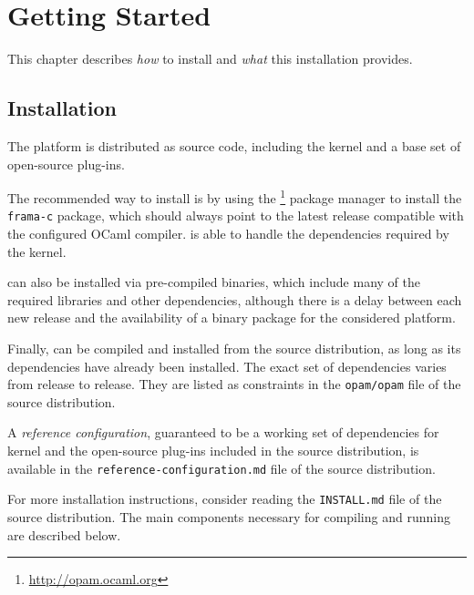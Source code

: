 \chapter{Getting Started}
\label{user-start}

This chapter describes \emph{how} to install \FramaC and
\emph{what} this installation provides.

\section{Installation}\label{sec:install}

The \FramaC platform is distributed as source code, including the \FramaC kernel
and a base set of open-source plug-ins.

The recommended way to install \FramaC is by using the
\opam{}\footnote{\url{http://opam.ocaml.org}} package manager to
install the \texttt{frama-c} package, which should always point to the latest
release compatible with the configured OCaml compiler. \opam is able to handle
the dependencies required by the \FramaC kernel.

\FramaC can also be installed via pre-compiled binaries,
which include many of the required libraries and other dependencies, although
there is a delay between each new \FramaC release and the availability of a
binary package for the considered platform.

Finally, \FramaC can be compiled and installed from the source distribution,
as long as its dependencies have already been installed. The exact set of
dependencies varies from release to release. They are listed as constraints
in the \texttt{opam/opam} file of the source distribution.

A {\em reference configuration}, guaranteed to be a working set of dependencies
for \FramaC kernel and the open-source plug-ins included in the source
distribution, is available in the \texttt{reference-configuration.md} file of
the source distribution.

For more installation instructions, consider reading the \texttt{INSTALL.md}
file of the source distribution. The main components necessary for compiling
and running \FramaC are described below.


